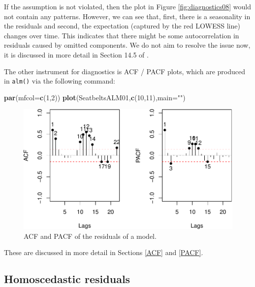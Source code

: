 \documentclass[
]{book}
\newenvironment{Shaded}{\begin{snugshade}}{\end{snugshade}}
\newcommand{\AttributeTok}[1]{\textcolor[rgb]{0.13,0.29,0.53}{#1}}
\newcommand{\DecValTok}[1]{\textcolor[rgb]{0.00,0.00,0.81}{#1}}
\newcommand{\FunctionTok}[1]{\textcolor[rgb]{0.13,0.29,0.53}{\textbf{#1}}}
\newcommand{\NormalTok}[1]{#1}
\newcommand{\StringTok}[1]{\textcolor[rgb]{0.31,0.60,0.02}{#1}}
\theoremstyle{definition}
\theoremstyle{definition}
\theoremstyle{definition}
\theoremstyle{definition}
\theoremstyle{remark}
\begin{document}
If the assumption is not violated, then the plot in Figure \ref{fig:diagnostics08} would not contain any patterns. However, we can see that, first, there is a seasonality in the residuals and second, the expectation (captured by the red LOWESS line) changes over time. This indicates that there might be some autocorrelation in residuals caused by omitted components. We do not aim to resolve the issue now, it is discussed in more detail in Section 14.5 of \citet{SvetunkovADAM}.

The other instrument for diagnostics is ACF / PACF plots, which are produced in \texttt{alm()} via the following command:

\begin{Shaded}
\begin{Highlighting}[]
\FunctionTok{par}\NormalTok{(}\AttributeTok{mfcol=}\FunctionTok{c}\NormalTok{(}\DecValTok{1}\NormalTok{,}\DecValTok{2}\NormalTok{))}
\FunctionTok{plot}\NormalTok{(SeatbeltsALM01,}\FunctionTok{c}\NormalTok{(}\DecValTok{10}\NormalTok{,}\DecValTok{11}\NormalTok{),}\AttributeTok{main=}\StringTok{""}\NormalTok{)}
\end{Highlighting}
\end{Shaded}

\begin{figure}
\centering
\includegraphics{Svetunkov---Statistics-for-Business-Analytics_files/figure-latex/diagnostics09-1.pdf}
\caption{\label{fig:diagnostics09}ACF and PACF of the residuals of a model.}
\end{figure}

These are discussed in more detail in Sections \ref{ACF} and \ref{PACF}.

\subsection{Homoscedastic residuals}\label{assumptionsResidualsAreIIDHomoscedasticity}
\end{document}
